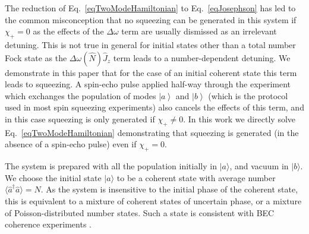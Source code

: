 \documentclass{iopart}
\newcommand{\ket}[1]{\ensuremath{\left|#1\right>}}
\begin{document}
The reduction of Eq.~\eqref{eqTwoModeHamiltonian} to Eq.~\eqref{eqJosephson} has led to the common misconception that no squeezing can be generated in this system if $\chi_+ = 0$ as the effects of the $\Delta\omega$ term are usually dismissed as an irrelevant detuning.  This is not true in general for initial states other than a total number Fock state as the $\Delta\omega(\hat{N})\hat{J}_z$ term leads to a number-dependent detuning.  We demonstrate in this paper that for the case of an initial coherent state this term leads to squeezing.  A spin-echo pulse applied half-way through the experiment which exchanges the population of modes $\ket{a}$ and $\ket{b}$ (which is the protocol used in most spin squeezing experiments) also cancels the effects of this term, and in this case squeezing is only generated if $\chi_+ \neq 0$.  In this work we directly solve Eq.~\eqref{eqTwoModeHamiltonian} demonstrating that squeezing is generated (in the absence of a spin-echo pulse) even if $\chi_+=0$.


The system is prepared with all the population initially in $|a\rangle$, and vacuum in $|b\rangle$. We choose the initial state $|a\rangle$ to be a coherent state with average number $\langle \hat{a}^{\dagger} \hat{a} \rangle = N$.  As the system is insensitive to the initial phase of the coherent state, this is equivalent to a mixture of coherent states of uncertain phase, or a mixture of Poisson-distributed number states. Such a state is consistent with BEC coherence experiments \cite{Hadzibabic2004}.  
\end{document}
